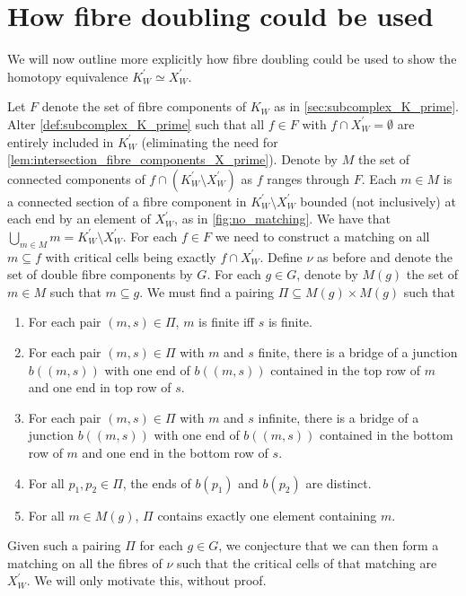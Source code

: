\documentclass[class=article, crop=false]{standalone}
\begin{document}
\section{How fibre doubling could be used}

We will now outline more explicitly how fibre doubling could be used to show the homotopy equivalence $K^\prime_W \simeq X^\prime_W$.

Let $F$ denote the set of fibre components of $K_W$ as in \cref{sec:subcomplex_K_prime}. Alter \cref{def:subcomplex_K_prime} such that all $f \in F$ with $f \cap X^\prime_W = \emptyset$ are entirely included in $K^\prime_W$ (eliminating the need for \cref{lem:intersection_fibre_components_X_prime}). Denote by $M$ the set of connected components of $f \cap (K^\prime_W \setminus X^\prime_W)$ as $f$ ranges through $F$. Each $m \in M$ is a connected section of a fibre component in $K^\prime_W \setminus X^\prime_W$ bounded (not inclusively) at each end by an element of $X^\prime_W$, as in \cref{fig:no_matching}. We have that $\bigcup_{m \in M}m = K^\prime_W \setminus X^\prime_W$.
For each $f \in F$ we need to construct a matching on all $m \subseteq f$ with critical cells being exactly $f \cap X^\prime_W$. Define $\nu$ as before and denote the set of double fibre components by $G$. For each $g \in G$, denote by $M(g)$ the set of $m \in M$ such that $m \subseteq g$. We must find a pairing $\Pi \subseteq M(g)\times M(g)$ such that
\begin{enumerate}
	\item For each pair $(m,s) \in \Pi$, $m$ is finite iff $s$ is finite.
	\item For each pair $(m,s) \in \Pi$ with $m$ and $s$ finite, there is a bridge of a junction $b((m,s))$ with one end of $b((m,s))$ contained in the top row of $m$ and one end in top row of $s$.
	\item For each pair $(m,s) \in \Pi$ with $m$ and $s$ infinite, there is a bridge of a junction $b((m,s))$ with one end of $b((m,s))$ contained in the bottom row of $m$ and one end in the bottom row of $s$.
	\item For all $p_1,p_2 \in \Pi$, the ends of $b(p_1)$ and $b(p_2)$ are distinct.
	\item For all $m \in M(g)$, $\Pi$ contains exactly one element containing $m$.
\end{enumerate}
Given such a pairing $\Pi$ for each $g \in G$, we conjecture that we can then form a matching on all the fibres of $\nu$ such that the critical cells of that matching are $X^\prime_W$. We will only motivate this, without proof.
\end{document}
